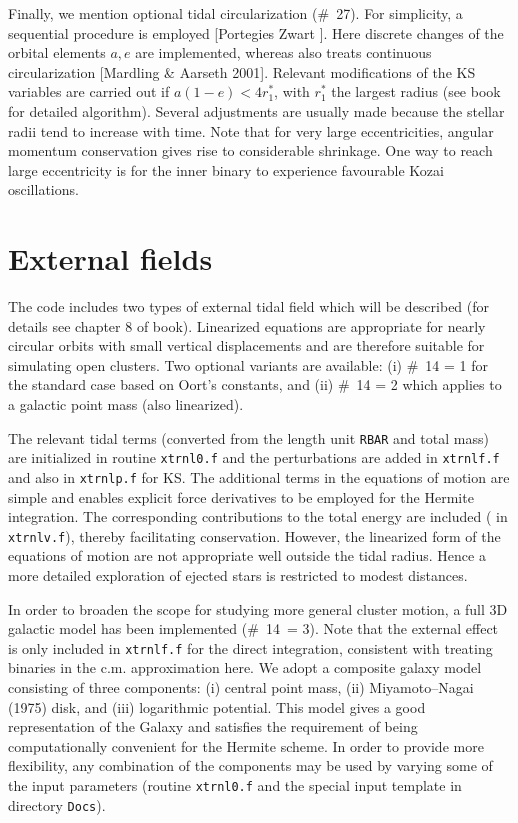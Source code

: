 \documentclass[12pt]{article}
\begin{document}
Finally, we mention optional tidal circularization (\#~27).
For simplicity, a sequential procedure is employed
[Portegies Zwart ].
Here discrete changes of the orbital elements $a, e$ are implemented,
whereas {} also treats continuous circularization
[Mardling \& Aarseth 2001].
Relevant modifications of the KS variables are carried out if
$a (1 - e) < 4 r^{\ast}_1$, with $r^{\ast}_1$ the largest radius (see book
for detailed algorithm).
Several adjustments are usually made because the stellar radii tend to
increase with time.
Note that for very large eccentricities, angular momentum conservation
gives rise to considerable shrinkage.
One way to reach large eccentricity is for the inner binary to experience
favourable Kozai oscillations.

\section{External fields}

The code includes two types of external tidal field which will be described
(for details see chapter 8 of book).
Linearized equations are appropriate for nearly circular orbits with
small vertical displacements and are therefore suitable for simulating
open clusters.
Two optional variants are available: (i) \#~14 = 1 for the standard case
based on Oort's constants, and (ii) \#~14 = 2 which applies to a galactic
point mass (also linearized).

The relevant tidal terms (converted from the length unit {\tt RBAR} and
total mass) are initialized in routine {\tt xtrnl0.f} and the perturbations
are added in {\tt xtrnlf.f} and also in {\tt xtrnlp.f} for KS.
The additional terms in the equations of motion are simple and enables
explicit force derivatives to be employed for the Hermite integration.
The corresponding contributions to the total energy are included
( in {\tt xtrnlv.f}), thereby facilitating conservation.
However, the linearized form of the equations of motion are not appropriate
well outside the tidal radius.
Hence a more detailed exploration of ejected stars is restricted to modest
distances.

In order to broaden the scope for studying more general cluster motion, a
full 3D galactic model has been implemented (\#~14~= 3).
Note that the external effect is only included in {\tt xtrnlf.f} for the
direct integration, consistent with treating binaries in the c.m.
approximation here.
We adopt a composite galaxy model consisting of three components:
(i) central point mass, (ii) Miyamoto--Nagai (1975) disk, and (iii)
logarithmic potential.
This model gives a good representation of the Galaxy and satisfies the
requirement of being computationally convenient for the Hermite scheme.
In order to provide more flexibility, any combination of the components may
be used by varying some of the input parameters (\cf routine {\tt xtrnl0.f}
and the special input template in directory {\tt Docs}).
\end{document}
